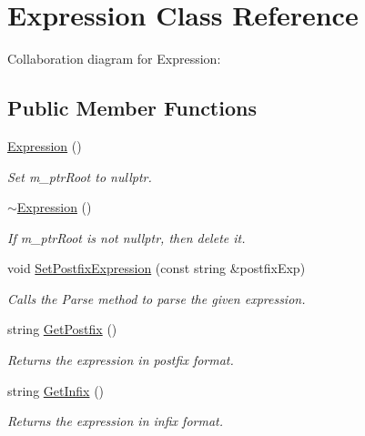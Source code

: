 \hypertarget{classExpression}{}\section{Expression Class Reference}
\label{classExpression}


Collaboration diagram for Expression\+:
\subsection*{Public Member Functions}
\begin{DoxyCompactItemize}
\item 
\hyperlink{classExpression_afcf87716bf0abfe8d414c92529e1564a}{Expression} ()\hypertarget{classExpression_afcf87716bf0abfe8d414c92529e1564a}{}\label{classExpression_afcf87716bf0abfe8d414c92529e1564a}

\begin{DoxyCompactList}\small\item\em Set m\+\_\+ptr\+Root to nullptr. \end{DoxyCompactList}\item 
\hyperlink{classExpression_a3e99570b177da619eeb2c5787cbb148e}{$\sim$\+Expression} ()\hypertarget{classExpression_a3e99570b177da619eeb2c5787cbb148e}{}\label{classExpression_a3e99570b177da619eeb2c5787cbb148e}

\begin{DoxyCompactList}\small\item\em If m\+\_\+ptr\+Root is not nullptr, then delete it. \end{DoxyCompactList}\item 
void \hyperlink{classExpression_a4517f9600a10f715def471a0fe0d1960}{Set\+Postfix\+Expression} (const string \&postfix\+Exp)\hypertarget{classExpression_a4517f9600a10f715def471a0fe0d1960}{}\label{classExpression_a4517f9600a10f715def471a0fe0d1960}

\begin{DoxyCompactList}\small\item\em Calls the Parse method to parse the given expression. \end{DoxyCompactList}\item 
string \hyperlink{classExpression_ac92e9a0c6746efc25f68bf52e53cfe0b}{Get\+Postfix} ()
\begin{DoxyCompactList}\small\item\em Returns the expression in postfix format. \end{DoxyCompactList}\item 
string \hyperlink{classExpression_a5ce8727756959f65c6c746b6573d3f8f}{Get\+Infix} ()
\begin{DoxyCompactList}\small\item\em Returns the expression in infix format. \end{DoxyCompactList}\end{DoxyCompactItemize}
